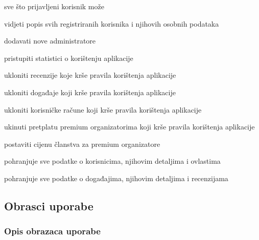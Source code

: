 \begin{packed_enum}
\begin{packed_enum}
					\item sve što prijavljeni korisnik može
					\item vidjeti popis svih registriranih korisnika i njihovih osobnih podataka
					\item dodavati nove administratore
					\item pristupiti statistici o korištenju aplikacije
					\item ukloniti recenzije koje krše pravila korištenja aplikacije
					\item ukloniti događaje koji krše pravila korištenja aplikacije
					\item ukloniti korisničke račune koji krše pravila korištenja aplikacije
					\item ukinuti pretplatu premium organizatorima koji krše pravila korištenja aplikacije
					\item postaviti cijenu članstva za premium organizatore					
				\end{packed_enum}

				\item  {}
				
				\begin{packed_enum}
					
					\item pohranjuje sve podatke o korisnicima, njihovim detaljima i ovlastima
					\item pohranjuje sve podatke o događajima, njihovim detaljima i recenzijama
					
				\end{packed_enum}
			\end{packed_enum}
			
			\eject 
			
			
				
			\subsection{Obrasci uporabe}
				
				
				\subsubsection{Opis obrazaca uporabe}
					

